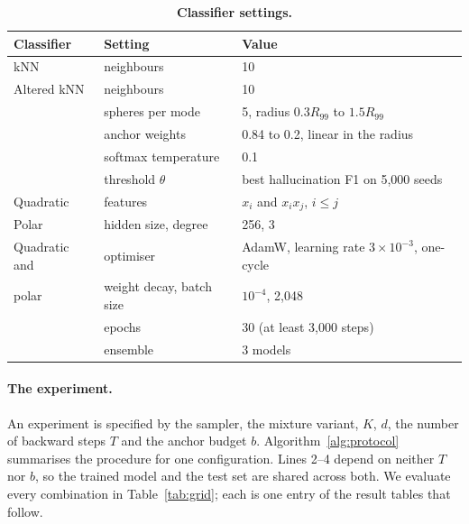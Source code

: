 \documentclass[11pt]{article}
\begin{document}
\begin{table}[htbp]
\centering
\small
\caption{\textbf{Classifier settings.}}
\label{tab:fatenets}
\begin{tabular}{lll}
\toprule
Classifier & Setting & Value \\
\midrule
kNN            & neighbours                    & 10 \\
\midrule
Altered kNN    & neighbours                    & 10 \\
               & spheres per mode              & 5, radius $0.3R_{99}$ to $1.5R_{99}$ \\
               & anchor weights                & 0.84 to 0.2, linear in the radius \\
               & softmax temperature           & 0.1 \\
               & threshold $\theta$            & best hallucination F1 on 5{,}000 seeds \\
\midrule
Quadratic      & features                      & $x_i$ and $x_i x_j$, $i \le j$ \\
\midrule
Polar          & hidden size, degree           & 256, 3 \\
\midrule
Quadratic and  & optimiser                     & AdamW, learning rate $3 \times 10^{-3}$, one-cycle \\
polar          & weight decay, batch size      & $10^{-4}$, 2{,}048 \\
               & epochs                        & 30 (at least 3{,}000 steps) \\
               & ensemble                      & 3 models \\
\bottomrule
\end{tabular}
\end{table}

\paragraph{The experiment.}
An experiment is specified by the sampler, the mixture variant, $K$, $d$, the number of backward
steps $T$ and the anchor budget $b$. Algorithm~\ref{alg:protocol} summarises the procedure for one
configuration. Lines 2--4 depend on neither $T$ nor $b$, so the trained model and the test set are
shared across both. We evaluate every combination in Table~\ref{tab:grid}; each is one entry of the
result tables that follow.
\end{document}

